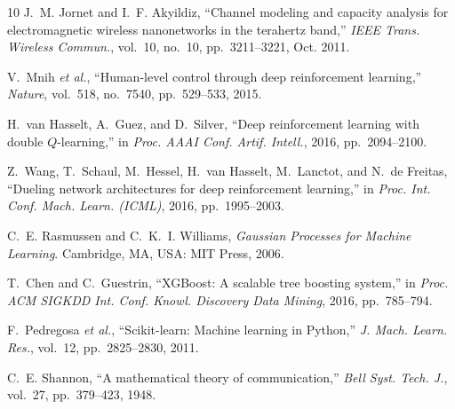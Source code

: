 \documentclass[journal]{IEEEtran}
\begin{document}
\begin{thebibliography}{10}
J.~M. Jornet and I.~F. Akyildiz,
``Channel modeling and capacity analysis for electromagnetic wireless nanonetworks in
the terahertz band,''
\emph{IEEE Trans. Wireless Commun.}, vol.~10, no.~10, pp.~3211--3221, Oct. 2011.

V.~Mnih \emph{et al.},
``Human-level control through deep reinforcement learning,''
\emph{Nature}, vol.~518, no.~7540, pp.~529--533, 2015.

H.~van Hasselt, A.~Guez, and D.~Silver,
``Deep reinforcement learning with double $Q$-learning,''
in \emph{Proc. AAAI Conf. Artif. Intell.}, 2016, pp.~2094--2100.

Z.~Wang, T.~Schaul, M.~Hessel, H.~van Hasselt, M.~Lanctot, and N.~de Freitas,
``Dueling network architectures for deep reinforcement learning,''
in \emph{Proc. Int. Conf. Mach. Learn. (ICML)}, 2016, pp.~1995--2003.

C.~E. Rasmussen and C.~K.~I. Williams,
\emph{Gaussian Processes for Machine Learning}.
Cambridge, MA, USA: MIT Press, 2006.

T.~Chen and C.~Guestrin,
``XGBoost: A scalable tree boosting system,''
in \emph{Proc. ACM SIGKDD Int. Conf. Knowl. Discovery Data Mining}, 2016,
pp.~785--794.

F.~Pedregosa \emph{et al.},
``Scikit-learn: Machine learning in Python,''
\emph{J. Mach. Learn. Res.}, vol.~12, pp.~2825--2830, 2011.

C.~E. Shannon,
``A mathematical theory of communication,''
\emph{Bell Syst. Tech. J.}, vol.~27, pp.~379--423, 1948.
\end{thebibliography}
\end{document}
